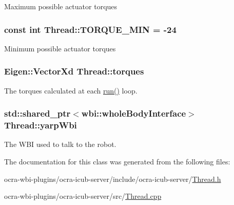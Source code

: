 \-Maximum possible actuator torques \hypertarget{classThread_ad44e5fbda8070c252ea71823a4b9a6db}{
\subsubsection[{\-T\-O\-R\-Q\-U\-E\-\_\-\-M\-I\-N}]{\setlength{\rightskip}{0pt plus 5cm}const int {\bf \-Thread\-::\-T\-O\-R\-Q\-U\-E\-\_\-\-M\-I\-N} = -\/24}}\label{classThread_ad44e5fbda8070c252ea71823a4b9a6db}
\-Minimum possible actuator torques \hypertarget{classThread_a3238993799b36af06f3858a3f65dcf1e}{
\subsubsection[{torques}]{\setlength{\rightskip}{0pt plus 5cm}\-Eigen\-::\-Vector\-Xd {\bf \-Thread\-::torques}}}\label{classThread_a3238993799b36af06f3858a3f65dcf1e}
\-The torques calculated at each \hyperlink{classThread_ad9373d8d725c46717dfce3130018fe3a}{run()} loop. \hypertarget{classThread_aa3f4bbc2dca15c247a13de1bdbc4f7a3}{
\subsubsection[{yarp\-Wbi}]{\setlength{\rightskip}{0pt plus 5cm}std\-::shared\-\_\-ptr$<$wbi\-::whole\-Body\-Interface$>$ {\bf \-Thread\-::yarp\-Wbi}}}\label{classThread_aa3f4bbc2dca15c247a13de1bdbc4f7a3}
\-The \-W\-B\-I used to talk to the robot. 

\-The documentation for this class was generated from the following files\-:\begin{DoxyCompactItemize}
\item 
ocra-\/wbi-\/plugins/ocra-\/icub-\/server/include/ocra-\/icub-\/server/\hyperlink{Thread_8h}{\-Thread.\-h}\item 
ocra-\/wbi-\/plugins/ocra-\/icub-\/server/src/\hyperlink{Thread_8cpp}{\-Thread.\-cpp}\end{DoxyCompactItemize}
